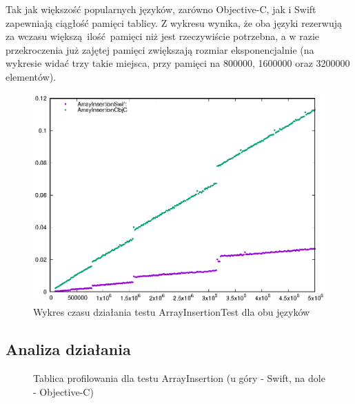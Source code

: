 \documentclass[mgr, shortabstract]{iithesis}
\begin{document}
Tak jak większość popularnych języków, zarówno Objective-C, jak i Swift zapewniają ciągłość pamięci tablicy. Z wykresu wynika, że oba języki rezerwują za wczasu większą ilość pamięci niż jest rzeczywiście potrzebna, a w razie przekroczenia już zajętej pamięci zwiększają rozmiar eksponencjalnie (na wykresie widać trzy takie miejsca, przy pamięci na 800000, 1600000 oraz 3200000 elementów).

\begin{figure}[h]
    \includegraphics{plots/ArrayInsertion.eps}
    \caption{Wykres czasu działania testu ArrayInsertionTest dla obu języków}
    \label{p:array_insertion}
\end{figure}

\subsection{Analiza działania}

\begin{figure}
    \caption{Tablica profilowania dla testu ArrayInsertion (u góry - Swift, na dole - Objective-C)}
    \label{i:array_insertion}
\end{figure}
\end{document}
